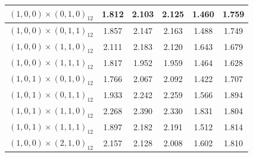 \begin{enumerate}[label=\alph*.]
\begin{longtable}{|c|c|c|c|c|c|}
        {$(1,0,0) \times (0,1,0)_{12}$} & 1.812 & 2.103 & 2.125 & 1.460 & 1.759 \\ \hline
        {$(1,0,0) \times (0,1,1)_{12}$} & 1.857 & 2.147 & 2.163 & 1.488 & 1.749 \\ \hline
        {$(1,0,0) \times (1,1,0)_{12}$} & 2.111 & 2.183 & 2.120 & 1.643 & 1.679 \\ \hline
        {$(1,0,0) \times (1,1,1)_{12}$} & 1.817 & 1.952 & 1.959 & 1.464 & 1.628 \\ \hline

        {$(1,0,1) \times (0,1,0)_{12}$} & 1.766 & 2.067 & 2.092 & 1.422 & 1.707 \\ \hline
        {$(1,0,1) \times (0,1,1)_{12}$} & 1.933 & 2.242 & 2.259 & 1.566 & 1.894 \\ \hline
        {$(1,0,1) \times (1,1,0)_{12}$} & 2.268 & 2.390 & 2.330 & 1.831 & 1.804 \\ \hline
        {$(1,0,1) \times (1,1,1)_{12}$} & 1.897 & 2.182 & 2.191 & 1.512 & 1.814 \\ \hline

        {$(1,0,0) \times (2,1,0)_{12}$} & 2.157 & 2.128 & 2.008 & 1.602 & 1.810 \\ \hline

    \end{longtable}
\end{enumerate}